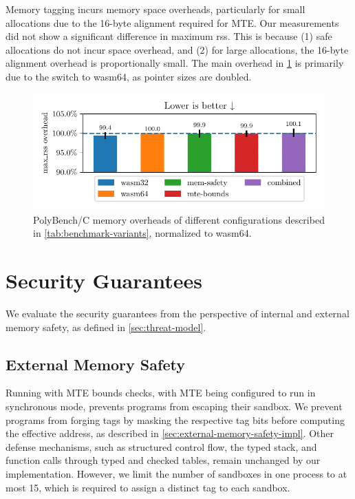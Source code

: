 Memory tagging incurs memory space overheads, particularly for small allocations due to the 16-byte alignment required for \ac{MTE}.
Our measurements did not show a significant difference in maximum \ac{rss}.
This is because (1) safe allocations do not incur space overhead, and (2) for large allocations, the 16-byte alignment overhead is proportionally small.
The main overhead in \cref{fig:memory-overheads} is primarily due to the switch to wasm64, as pointer sizes are doubled.

\begin{figure}[t]
    \centering
    \includegraphics{plots/mem-overhead}
    \caption{PolyBench/C memory overheads of different configurations described in \cref{tab:benchmark-variants}, normalized to wasm64.}
    \label{fig:memory-overheads}
\end{figure}


\section{Security Guarantees}\label{sec:security-guarantees}

We evaluate the security guarantees from the perspective of internal and external memory safety, as defined in \cref{sec:threat-model}.

\subsection{External Memory Safety}
\label{subsec:sec-guarantees-external-memory-safety}

Running with \ac{MTE} bounds checks, with \ac{MTE} being configured to run in synchronous mode, prevents programs from escaping their sandbox.
We prevent programs from forging tags by masking the respective tag bits before computing the effective address, as described in \cref{sec:external-memory-safety-impl}.
Other defense mechanisms, such as structured control flow, the typed stack, and function calls through typed and checked tables, remain unchanged by our implementation.
However, we limit the number of sandboxes in one process to at most 15, which is required to assign a distinct tag to each sandbox.

